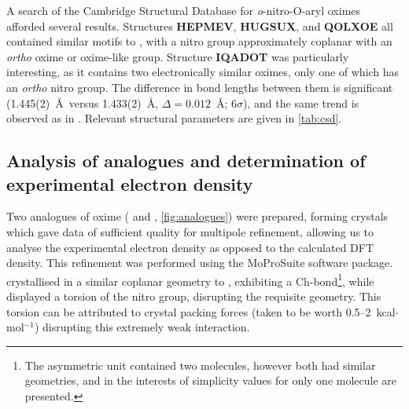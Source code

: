 \begin{refsection}
A search of the Cambridge Structural Database for \emph{o}-nitro-O-aryl oximes afforded several results.\autocite{CSD}
Structures \textbf{HEPMEV}, \textbf{HUGSUX}, and \textbf{QOLXOE} all contained similar motifs to , with a nitro group approximately coplanar with an \emph{ortho} oxime or oxime-like group.\autocite{Saavedra2001,Kostyanovsky2002,Saavedra2006a}
Structure \textbf{IQADOT} was particularly interesting, as it contains two electronically similar oximes, only one of which has an \emph{ortho} nitro group.\autocite{Renaudet2003}
The difference in bond lengths between them is significant (1.445(2)~\AA~versus 1.433(2)~\AA, $\Delta = 0.012$~\AA{}; 6$\sigma$), and the same trend is observed as in .
Relevant structural parameters are given in \cref{tab:csd}.

\subsection{Analysis of analogues and determination of experimental electron density}
Two analogues of oxime  ( and , \cref{fig:analogues}) were prepared, forming crystals which gave data of sufficient quality for multipole refinement, allowing us to analyse the experimental electron density as opposed to the calculated DFT density.\autocite{Hansen1978}
This refinement was performed using the MoProSuite software package.\autocite{Jelsch2005}
 crystallised in a similar coplanar geometry to , exhibiting a Ch-bond\footnote{The asymmetric unit contained two molecules, however both had similar geometries, and in the interests of simplicity values for only one molecule are presented.}, while  displayed a torsion of the nitro group, disrupting the requisite geometry.
This torsion can be attributed to crystal packing forces (taken to be worth 0.5--2~kcal$\cdot$mol$^{-1}$) disrupting this extremely weak interaction.\autocite{Dunitz2009}


\end{refsection}
